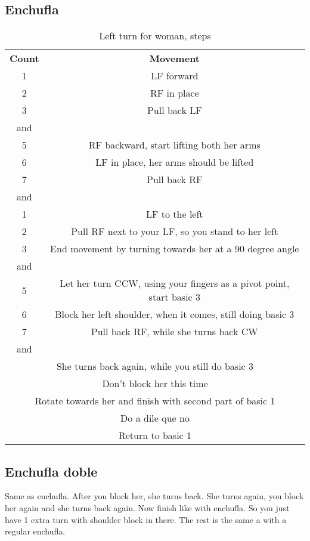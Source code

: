 \subsection{Enchufla}
\begin{table}[H]
\centering
\begin{tabular}{cc}
  \toprule
  \textbf{Count} & \textbf{Movement}\\
  \cmidrule(lr){1-1}\cmidrule(lr){2-2}
  1 & LF forward\\
  2 & RF in place\\
  3 & Pull back LF\\
  and &\\
  5 & RF backward, start lifting both her arms\\
  6 & LF in place, her arms should be lifted\\
  7 & Pull back RF\\
  and &\\
  1 & LF to the left\\
  2 & Pull RF next to your LF, so you stand to her left\\
  3 & End movement by turning towards her at a 90 degree angle\\
  and &\\
  5 & Let her turn CCW, using your fingers as a pivot point, start basic 3\\
  6 & Block her left shoulder, when it comes, still doing basic 3\\
  7 & Pull back RF, while she turns back CW\\
  and &\\
  \multicolumn{2}{c}{She turns back again, while you still do basic 3}\\
  \multicolumn{2}{c}{Don't block her this time}\\
  \multicolumn{2}{c}{Rotate towards her and finish with second part of basic 1}\\
  \multicolumn{2}{c}{Do a dile que no}\\
  \multicolumn{2}{c}{Return to basic 1}\\
  \bottomrule
\end{tabular}
\label{left_turn_for_woman_steps}
\caption{Left turn for woman, steps}
\end{table}

\subsection{Enchufla doble}
Same as enchufla.
After you block her, she turns back.
She turns again, you block her again and she turns back again.
Now finish like with enchufla.
So you just have 1 extra turn with shoulder block in there.
The rest is the same a with a regular enchufla.
